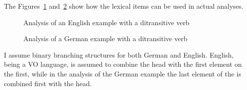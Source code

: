 The Figures~\ref{fig-nobody-gives-him-the-book}
and~\ref{fig-niemand-ihm-das-buch-gibt} show how the lexical items can be used in actual analyses.

\begin{figure}
\caption{Analysis of an English example with a ditransitive verb}\label{fig-nobody-gives-him-the-book}
\end{figure}



\begin{figure}
\caption{Analysis of a German example with a ditransitive verb}\label{fig-niemand-ihm-das-buch-gibt}
\end{figure}
I assume binary branching structures for both German and English. English, being a VO language, is assumed to combine the
head with the first element on the \compsl first, while in the analysis of the German example the last element of the
\compsl is combined first with the head.

